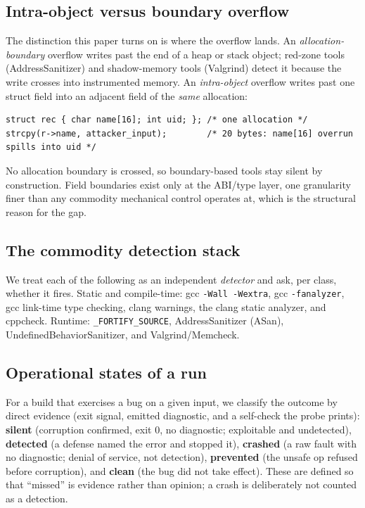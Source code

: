 \documentclass[11pt]{article}
\begin{document}
\subsection*{Intra-object versus boundary overflow}
The distinction this paper turns on is where the overflow lands. An \emph{allocation-boundary}
overflow writes past the end of a heap or stack object; red-zone tools (AddressSanitizer)
and shadow-memory tools (Valgrind) detect it because the write crosses into instrumented
memory. An \emph{intra-object} overflow writes past one struct field into an adjacent field
of the \emph{same} allocation:

\begin{lstlisting}
struct rec { char name[16]; int uid; }; /* one allocation */
strcpy(r->name, attacker_input);        /* 20 bytes: name[16] overrun spills into uid */
\end{lstlisting}

No allocation boundary is crossed, so boundary-based tools stay silent by construction.
Field boundaries exist only at the ABI/type layer, one granularity finer than any commodity
mechanical control operates at, which is the structural reason for the gap.

\subsection*{The commodity detection stack}
We treat each of the following as an independent \emph{detector} and ask, per class, whether
it fires. Static and compile-time: gcc \texttt{-Wall -Wextra}, gcc \texttt{-fanalyzer}, gcc
link-time type checking, clang warnings, the clang static analyzer, and cppcheck. Runtime:
\texttt{\_FORTIFY\_SOURCE}, AddressSanitizer (ASan), UndefinedBehaviorSanitizer, and
Valgrind/Memcheck.

\subsection*{Operational states of a run}
For a build that exercises a bug on a given input, we classify the outcome by direct
evidence (exit signal, emitted diagnostic, and a self-check the probe prints): \textbf{silent}
(corruption confirmed, exit 0, no diagnostic; exploitable and undetected), \textbf{detected}
(a defense named the error and stopped it), \textbf{crashed} (a raw fault with no diagnostic;
denial of service, not detection), \textbf{prevented} (the unsafe op refused before
corruption), and \textbf{clean} (the bug did not take effect). These are defined so that
``missed'' is evidence rather than opinion; a crash is deliberately not counted as a
detection.
\end{document}

